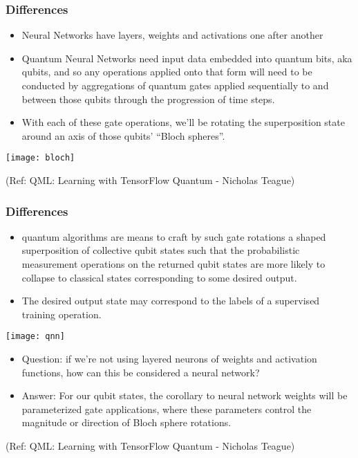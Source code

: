  \begin{frame}[fragile]\frametitle{Differences}
 
\begin{itemize}
\item  Neural Networks have layers, weights and activations one after another
\item Quantum Neural Networks need  input data embedded into quantum bits,
aka qubits, and so any operations applied onto that form will need to be conducted by
aggregations of quantum gates applied sequentially to and between those qubits
through the progression of time steps. 
\item With each of these gate operations, we’ll be
rotating the superposition state around an axis of those qubits’ ``Bloch spheres''.
\end{itemize}

\begin{center}
\texttt{[image: bloch]}
\end{center}
	
	
\tiny{(Ref: QML: Learning with TensorFlow Quantum - Nicholas Teague)}

\end{frame}

 \begin{frame}[fragile]\frametitle{Differences}
 
\begin{itemize}
\item  quantum algorithms are means to craft by such gate rotations a
shaped superposition of collective qubit states such that the probabilistic measurement
operations on the returned qubit states are more likely to collapse to classical states
corresponding to some desired output. 
\item The desired output state may correspond to the labels of a
supervised training operation.
\end{itemize}

\begin{center}
\texttt{[image: qnn]}
\end{center}
	
\begin{itemize}
\item  Question: if we’re not using layered neurons of weights and activation functions, how can this
be considered a neural network?
\item Answer: For our qubit states, the corollary to neural network weights will be parameterized gate applications, where these parameters control the magnitude or direction of Bloch sphere rotations.
\end{itemize}
	
\tiny{(Ref: QML: Learning with TensorFlow Quantum - Nicholas Teague)}

\end{frame}

